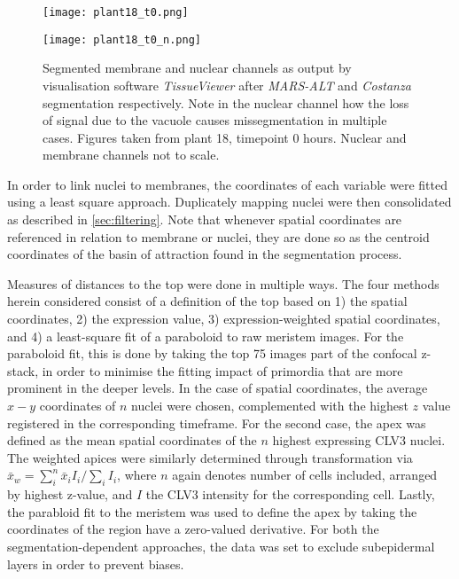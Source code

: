 \begin{figure}[H]
    \centering
    \begin{minipage}{0.49\textwidth}
        \centering
        \texttt{[image: plant18\_t0.png]}
      \end{minipage}\hfill
      \begin{minipage}{.49\textwidth}
        \centering
        \texttt{[image: plant18\_t0\_n.png]}
      \end{minipage}
      \caption[Segmented data]{Segmented membrane and nuclear channels as output by
        visualisation software \textit{TissueViewer} after \textit{MARS-ALT} and
        \textit{Costanza} segmentation respectively. Note in the nuclear channel
        how the loss of signal due to the vacuole causes missegmentation in
        multiple cases. Figures taken from plant 18, timepoint 0 hours. Nuclear
        and membrane channels not to scale.}  
\end{figure}

In order to link nuclei to membranes, the coordinates of each variable
were fitted using a least square approach. Duplicately mapping nuclei were then
consolidated as described in \cref{sec:filtering}. Note that whenever spatial
coordinates are referenced in relation to membrane or nuclei, they are done so
as the centroid coordinates of the basin of attraction found in the segmentation
process.

Measures of distances to the top were done in multiple ways. The four methods
herein considered consist of a definition of the top based on 1) the spatial
coordinates, 2) the expression value, 3) expression-weighted spatial
coordinates, and 4) a least-square fit of a paraboloid to raw meristem images.
For the paraboloid fit, this is done by taking the top 75 images part of the
confocal z-stack, in order to minimise the fitting impact of primordia that
are more prominent in the deeper levels.
In the case of spatial coordinates, the average $x-y$  
coordinates of $n$ nuclei were chosen, complemented with the highest $z$ value
registered in the corresponding timeframe. For the second case, the apex was
defined as the mean spatial coordinates of the $n$ highest expressing CLV3
nuclei. The weighted apices were similarly determined through transformation via
$\bar{x}_{w} = \sum^{n}_{i} \bar{x}_{i}I_i / \sum_{i} I_i$, where $n$ again denotes number of cells included,
arranged by highest z-value, and $I$ the CLV3 intensity for the
corresponding cell.
Lastly, the parabloid fit to the meristem was used to define the apex by
taking the coordinates of the region have a zero-valued derivative. For both the
segmentation-dependent approaches, the data was set to exclude subepidermal
layers in order to prevent biases. 

